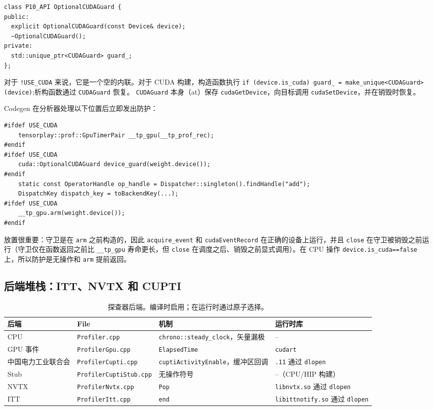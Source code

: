\begin{lstlisting}[caption={OptionalCUDAGuard.}, label=lst:optionalguard, style=cppstyle]
class P10_API OptionalCUDAGuard {
public:
  explicit OptionalCUDAGuard(const Device& device);
  ~OptionalCUDAGuard();
private:
  std::unique_ptr<CUDAGuard> guard_;
};
\end{lstlisting}

对于 \texttt{!USE\_CUDA} 来说，它是一个空的内联。对于 CUDA 构建，构造函数执行 \texttt{if (device.is\_cuda) guard\_ = make\_unique<CUDAGuard>(device)};析构函数通过 \texttt{CUDAGuard} 恢复。 \texttt{CUDAGuard} 本身（at）保存 \texttt{cudaGetDevice}，向目标调用 \texttt{cudaSetDevice}，并在销毁时恢复。

Codegen 在分析器处理以下位置后立即发出防护：

\begin{lstlisting}[caption={device guard emission.}, label=lst:genguard, style=cppstyle]
#ifdef USE_CUDA
    tensorplay::prof::GpuTimerPair __tp_gpu(__tp_prof_rec);
#endif
#ifdef USE_CUDA
    cuda::OptionalCUDAGuard device_guard(weight.device());
#endif
    static const OperatorHandle op_handle = Dispatcher::singleton().findHandle("add");
    DispatchKey dispatch_key = toBackendKey(...);
#ifdef USE_CUDA
    __tp_gpu.arm(weight.device());
#endif
\end{lstlisting}

放置很重要：守卫是在 \texttt{arm} 之前构造的，因此 \texttt{acquire\_event} 和 \texttt{cudaEventRecord} 在正确的设备上运行，并且 \texttt{close} 在守卫被销毁之前运行（守卫仅在函数返回之前比 \texttt{\_\_tp\_gpu} 寿命更长，但 \texttt{close} 在调度之后、销毁之前显式调用）。在 CPU 操作 \texttt{device.is\_cuda==false} 上，所以防护是无操作和 \texttt{arm} 提前返回。

\subsection{后端堆栈：ITT、NVTX 和 CUPTI}

\begin{table}[H]
\centering
\caption{探查器后端。编译时启用；在运行时通过原子选择。}
\label{tab:profbackends2}
\small
\begin{tabular}{llll}
\toprule
后端 & File & 机制 & 运行时库 \\
\midrule
CPU & \texttt{Profiler.cpp} & \texttt{chrono::steady\_clock}，矢量漏极 & -- \\
GPU 事件 & \texttt{ProfilerGpu.cpp} & \texttt{ElapsedTime} & \texttt{cudart} \\
中国电力工业联合会 & \texttt{ProfilerCupti.cpp} & \texttt{cuptiActivityEnable}，缓冲区回调 & \texttt{.11} 通过 \texttt{dlopen} \\
Stub & \texttt{ProfilerCuptiStub.cpp} & 无操作符号 & --（CPU/HIP 构建） \\
NVTX & \texttt{ProfilerNvtx.cpp} & \texttt{Pop} & \texttt{libnvtx.so} 通过 \texttt{dlopen} \\
ITT & \texttt{ProfilerItt.cpp} & \texttt{end} & \texttt{libittnotify.so} 通过 \texttt{dlopen} \\
\bottomrule
\end{tabular}
\end{table}

